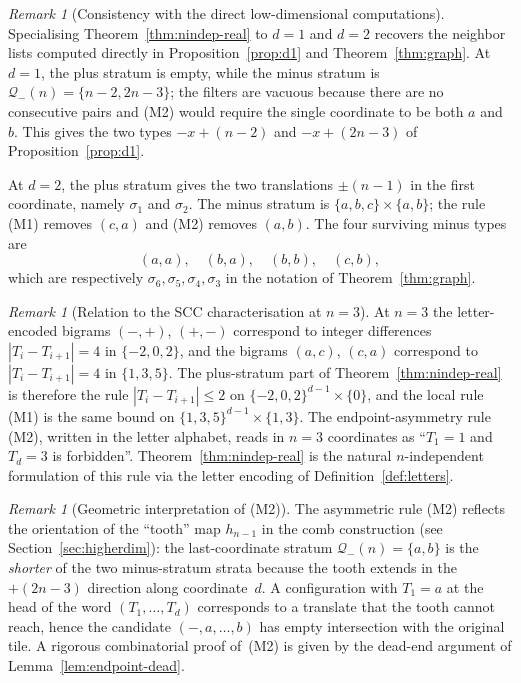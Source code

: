 \documentclass{amsart}
\theoremstyle{definition}
\theoremstyle{remark}
\newtheorem{remark}[theorem]{Remark}
\begin{document}
\begin{remark}[Consistency with the direct low-dimensional computations]
Specialising Theorem~\ref{thm:nindep-real} to $d=1$ and $d=2$
recovers the neighbor lists computed directly in
Proposition~\ref{prop:d1} and Theorem~\ref{thm:graph}.  At $d=1$,
the plus stratum is empty, while the minus stratum is
$\mathcal{Q}_-(n) = \{n{-}2, 2n{-}3\}$; the filters are vacuous
because there are no consecutive pairs and \textup{(M2)} would require
the single coordinate to be both $a$ and $b$.  This gives the two
types $-x+(n{-}2)$ and $-x+(2n{-}3)$ of
Proposition~\ref{prop:d1}.

At $d=2$, the plus stratum gives the two translations
$\pm(n{-}1)$ in the first coordinate, namely $\sigma_1$ and
$\sigma_2$.  The minus stratum is
$\{a,b,c\} \times \{a,b\}$; the rule \textup{(M1)} removes
$(c,a)$ and \textup{(M2)} removes $(a,b)$.  The four surviving
minus types are
\[
  (a,a),\quad (b,a),\quad (b,b),\quad (c,b),
\]
which are respectively $\sigma_6, \sigma_5, \sigma_4, \sigma_3$
in the notation of Theorem~\ref{thm:graph}.
\end{remark}

\begin{remark}[Relation to the SCC characterisation
at $n = 3$]
\label{rem:scc-n3}
At $n = 3$ the letter-encoded bigrams $(-, +)$, $(+, -)$ correspond
to integer differences $|T_i - T_{i+1}| = 4$ in $\{-2, 0, 2\}$,
and the bigrams $(a, c)$, $(c, a)$ correspond to
$|T_i - T_{i+1}| = 4$ in $\{1, 3, 5\}$.  The plus-stratum part
of Theorem~\ref{thm:nindep-real} is therefore the rule
$|T_i - T_{i+1}| \le 2$ on $\{-2, 0, 2\}^{d-1} \times \{0\}$,
and the local rule \textup{(M1)} is the same bound on
$\{1, 3, 5\}^{d-1} \times \{1, 3\}$.  The endpoint-asymmetry
rule \textup{(M2)}, written in the letter alphabet, reads in
$n = 3$ coordinates as ``$T_1 = 1$ and $T_d = 3$ is forbidden''.
Theorem~\ref{thm:nindep-real} is the natural $n$-independent
formulation of this rule via the letter
encoding of Definition~\ref{def:letters}.
\end{remark}

\begin{remark}[Geometric interpretation of \textup{(M2)}]
\label{rem:M2-geometric}
The asymmetric rule \textup{(M2)} reflects the orientation of the
``tooth'' map $h_{n-1}$ in the comb construction
\textup{(}see Section~\ref{sec:higherdim}\textup{)}: the
last-coordinate stratum $\mathcal{Q}_-(n) = \{a, b\}$ is the
\emph{shorter} of the two minus-stratum strata because the tooth
extends in the $+(2n{-}3)$ direction along coordinate~$d$.  A
configuration with $T_1 = a$ at the head of the word $(T_1,
\ldots, T_d)$ corresponds to a translate that the tooth cannot
reach, hence the candidate $(-, a, \ldots, b)$ has empty
intersection with the original tile.  A rigorous combinatorial
proof of~\textup{(M2)} is given by the dead-end argument of
Lemma~\ref{lem:endpoint-dead}.
\end{remark}
\end{document}
